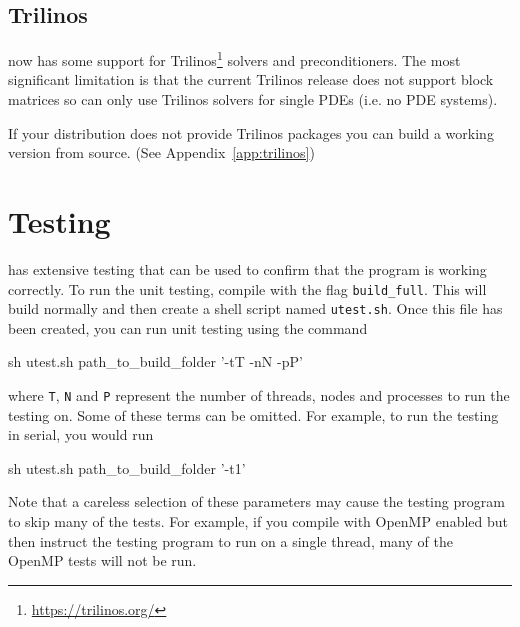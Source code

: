 \subsection{Trilinos}
\escript now has some support for Trilinos\footnote{\url{https://trilinos.org/}}
solvers and preconditioners.
The most significant limitation is that the current Trilinos release does not
support block matrices so \escript can only use Trilinos solvers for single
PDEs (i.e. no PDE systems).

If your distribution does not provide Trilinos packages you can build a working
version from source. (See Appendix~\ref{app:trilinos})


\section{Testing \escript}\label{chap:utest}

\escript has extensive testing that can be used to confirm that the program is working correctly. To run the unit testing, compile \escript with the flag \texttt{build_full}. This will build \escript normally and then create a shell script named \texttt{utest.sh}. Once this file has been created, you can run unit testing using the command
\begin{shellCode}
sh utest.sh path_to_build_folder '-tT -nN -pP'
\end{shellCode}
where \texttt{T}, \texttt{N} and \texttt{P} represent the number of threads, nodes and processes to run the testing on. Some of these terms can be omitted. For example, to run the testing in serial, you would run
\begin{shellCode}
sh utest.sh path_to_build_folder '-t1'
\end{shellCode}

Note that a careless selection of these parameters may cause the testing program to skip many of the tests. For example, if you compile \escript with OpenMP enabled but then instruct the testing program to run on a single thread, many of the OpenMP tests will not be run.
